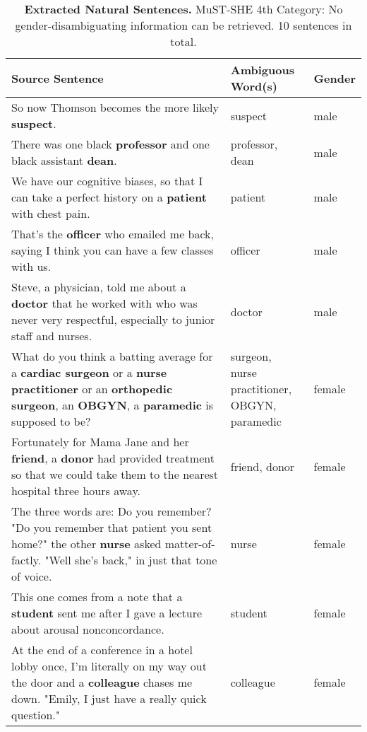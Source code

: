 \begin{table} 
    \begin{tabularx}{\linewidth}{|X|l|l|}
        \hline
        \textbf{Source Sentence} & \textbf{Ambiguous Word(s)} & \textbf{Gender} \\ \hline
        So now Thomson becomes the more likely \textbf{suspect}. & suspect & male \\ \hline
        There was one black \textbf{professor} and one black assistant \textbf{dean}. & professor, dean & male \\ \hline
        We have our cognitive biases, so that I can take a perfect history on a \textbf{patient} with chest pain. & patient & male \\ \hline
        That's the \textbf{officer} who emailed me back, saying I think you can have a few classes with us.  & officer & male \\ \hline
        Steve, a physician, told me about a \textbf{doctor} that he worked with who was never very respectful, especially to junior staff and nurses. & doctor & male \\ \hline
        What do you think a batting average for a \textbf{cardiac surgeon} or a \textbf{nurse practitioner} or an \textbf{orthopedic surgeon}, an \textbf{OBGYN}, a \textbf{paramedic} is supposed to be? & \makecell[tl]{surgeon, \\ nurse practitioner, \\ OBGYN, paramedic} & female \\ \hline
        Fortunately for Mama Jane and her \textbf{friend}, a \textbf{donor} had provided treatment so that we could take them to the nearest hospital three hours away. & friend, donor & female \\ \hline
        The three words are: Do you remember? "Do you remember that patient you sent home?" the other \textbf{nurse} asked matter-of-factly. "Well she's back," in just that tone of voice. & nurse & female \\ \hline
        This one comes from a note that a \textbf{student} sent me after I gave a lecture about arousal nonconcordance. & student & female \\ \hline
        At the end of a conference in a hotel lobby once, I'm literally on my way out the door and a \textbf{colleague} chases me down. "Emily, I just have a really quick question."  & colleague & female \\ \hline
    \end{tabularx}
    \caption{\textbf{Extracted Natural Sentences.} MuST-SHE 4th Category: No gender-disambiguating information can be retrieved. 10 sentences in total.}
    \label{tab:mustshe_sentences}
\end{table}


